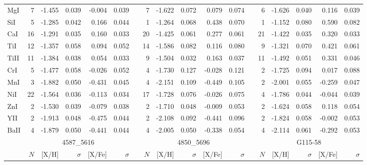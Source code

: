 \documentclass{aa}
\begin{document}
\begin{appendix}
\begin{landscape}
\begin{longtable}{lrrrrrrrrrrrrrrrrr}
MgI  &      7&    -1.455&     0.039&    -0.004&     0.039&&      7&    -1.622&     0.072&     0.079&     0.074&&      6&    -1.626&     0.040&     0.116&     0.039\\
SiI  &      5&    -1.285&     0.042&     0.166&     0.044&&      1&    -1.264&     0.068&     0.438&     0.070&&      1&    -1.152&     0.080&     0.590&     0.082\\
CaI  &     16&    -1.291&     0.035&     0.160&     0.033&&     20&    -1.425&     0.061&     0.277&     0.061&&     21&    -1.422&     0.035&     0.320&     0.033\\
TiI  &     12&    -1.357&     0.058&     0.094&     0.052&&     14&    -1.586&     0.082&     0.116&     0.080&&      9&    -1.321&     0.070&     0.421&     0.061\\
TiII &     11&    -1.384&     0.038&     0.054&     0.033&&      9&    -1.504&     0.032&     0.163&     0.037&&     11&    -1.492&     0.051&     0.331&     0.046\\
CrI  &      5&    -1.477&     0.058&    -0.026&     0.052&&      4&    -1.730&     0.127&    -0.028&     0.121&&      2&    -1.725&     0.094&     0.017&     0.088\\
MnI  &      3&    -1.882&     0.050&    -0.431&     0.045&&      4&    -2.151&     0.109&    -0.449&     0.105&&      2&    -2.001&     0.055&    -0.259&     0.047\\
NiI  &     22&    -1.564&     0.036&    -0.113&     0.034&&     17&    -1.728&     0.076&    -0.026&     0.075&&      4&    -1.786&     0.044&    -0.044&     0.039\\
ZnI  &      2&    -1.530&     0.039&    -0.079&     0.038&&      2&    -1.710&     0.048&    -0.009&     0.053&&      2&    -1.624&     0.058&     0.118&     0.054\\
YII  &      2&    -1.913&     0.048&    -0.475&     0.044&&      2&    -2.108&     0.092&    -0.441&     0.096&&      2&    -1.824&     0.058&    -0.002&     0.053\\
BaII &      4&    -1.879&     0.050&    -0.441&     0.044&&      4&    -2.005&     0.050&    -0.338&     0.054&&      4&    -2.114&     0.061&    -0.292&     0.053\\\hline\hline
     &                     \multicolumn{5}{c}{4587\_5616}&&                     \multicolumn{5}{c}{4850\_5696}&&                     \multicolumn{5}{c}{G115-58   }\\\cline{2-6}\cline{8-12}\cline{14-18}
     & $N$ & [{X}/{H}] & $\sigma$ & [{X}/{Fe}] & $\sigma$&& $N$ & [{X}/{H}] & $\sigma$ & [{X}/{Fe}] & $\sigma$&& $N$ & [{X}/{H}] & $\sigma$ & [{X}/{Fe}] & $\sigma$\\\hline

\end{longtable}
\end{landscape}
\end{appendix}
\end{document}
